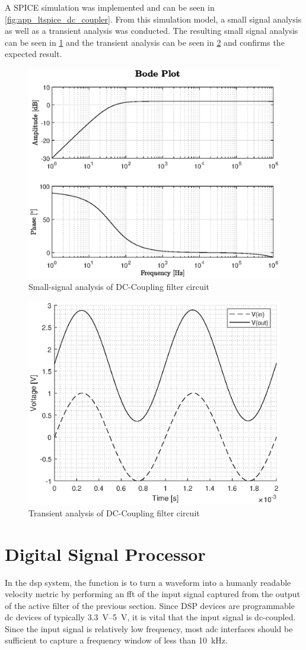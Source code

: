 A SPICE simulation was implemented and can be seen in \cref{fig:app_ltspice_dc_coupler}. From this simulation model, a small signal analysis as well as a transient analysis was conducted. The resulting small signal analysis can be seen in \cref{fig:3_dccoupler_sim_ac} and the transient analysis can be seen in \cref{fig:3_dccoupler_sim_transient} and confirms the expected result.
\begin{figure}[htbp]
	\centering
	\includegraphics[width=.8\textwidth]{Figures/3_dc_coupler_sim.eps}
	\caption{Small-signal analysis of DC-Coupling filter circuit}
	\label{fig:3_dccoupler_sim_ac}
\end{figure}
\begin{figure}[htbp]
	\centering
	\includegraphics[width=.8\textwidth]{Figures/3_dc_coupler_sim_transient.eps}
	\caption{Transient analysis of DC-Coupling filter circuit}
	\label{fig:3_dccoupler_sim_transient}
\end{figure}

\section{Digital Signal Processor}
In the \gls{dsp} system, the function is to turn a waveform into a humanly readable velocity metric by performing an \gls{fft} of the input signal captured from the output of the active filter of the previous section. Since DSP devices are programmable \gls{dc} devices of typically \qtyrange{3.3}{5}{\volt}, it is vital that the input signal is \gls{dc}-coupled. Since the input signal is relatively low frequency, most \gls{adc} interfaces should be sufficient to capture a frequency window of less than \qty{10}{\kilo\hertz}.